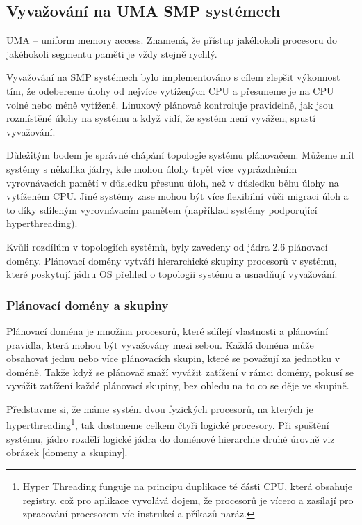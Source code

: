 \documentclass[
  master=true,
  font=sans,
  printversion=false,
  joinlists=true,
  figures=true,
  tables=true,
  sourcecodes=false,
  theorems=false,
  bibencoding=utf8,
  language=czech,
  encoding=utf8,
  field=ainfk,
  biblatex,
  glossaries,
  index
]{kidiplom}
\begin{document}
\subsection{Vyvažování na UMA SMP systémech}

UMA – uniform memory access. Znamená, že přístup jakéhokoli procesoru do jakéhokoli segmentu paměti je vždy stejně rychlý.

Vyvažování na SMP systémech bylo implementováno s cílem zlepšit výkonnost tím, že odebereme úlohy od nejvíce vytížených CPU a přesuneme je na CPU volné nebo méně vytížené. Linuxový plánovač kontroluje pravidelně, jak jsou rozmístěné úlohy na systému a když vidí, že systém není vyvážen, spustí vyvažování.

Důležitým bodem je správné chápání topologie systému plánovačem. Můžeme mít systémy s několika jádry, kde mohou úlohy trpět více vyprázdněním vyrovnávacích pamětí v důsledku přesunu úloh, než v důsledku běhu úlohy na vytíženém CPU. Jiné systémy zase mohou být více flexibilní vůči migraci úloh a to díky sdíleným vyrovnávacím pamětem (například systémy podporující hyperthreading).

Kvůli rozdílům v topologiích systémů, byly zavedeny od jádra 2.6 plánovací domény. Plánovací domény vytváří hierarchické skupiny procesorů v systému, které poskytují jádru OS přehled o topologii systému a usnadňují vyvažování.

\newpage
\subsubsection{Plánovací domény a skupiny}

Plánovací doména je množina procesorů, které sdílejí vlastnosti a plánování pravidla, která mohou být vyvažovány mezi sebou. Každá doména může obsahovat jednu nebo více plánovacích skupin, které se považují za jednotku v doméně. Takže když se plánovač snaží vyvážit zatížení v rámci domény, pokusí se vyvážit zatížení každé plánovací skupiny, bez ohledu na to co se děje ve skupině.



Představme si, že máme systém dvou fyzických procesorů, na kterých je hyperthreading\footnote{Hyper Threading funguje na principu duplikace té části CPU, která obsahuje registry, což pro aplikace vyvolává dojem, že procesorů je vícero a zasílají pro zpracování procesorem víc instrukcí a příkazů naráz.}, tak dostaneme celkem čtyři logické procesory. Při spuštění systému, jádro rozdělí logické jádra do doménové hierarchie druhé úrovně viz obrázek \ref{domeny a skupiny}.
\end{document}
